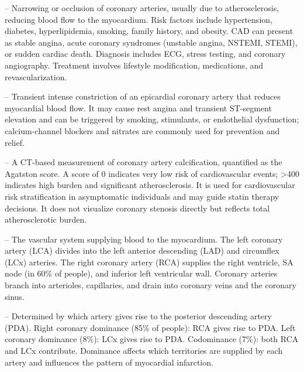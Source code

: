 -- Narrowing or occlusion of coronary arteries, usually due to atherosclerosis, reducing blood flow to the myocardium. Risk factors include hypertension, diabetes, hyperlipidemia, smoking, family history, and obesity. CAD can present as stable angina, acute coronary syndromes (unstable angina, NSTEMI, STEMI), or sudden cardiac death. Diagnosis includes ECG, stress testing, and coronary angiography. Treatment involves lifestyle modification, medications, and revascularization.

-- Transient intense constriction of an epicardial coronary artery that reduces myocardial blood flow. It may cause rest angina and transient ST-segment elevation and can be triggered by smoking, stimulants, or endothelial dysfunction; calcium-channel blockers and nitrates are commonly used for prevention and relief.

-- A CT-based measurement of coronary artery calcification, quantified as the Agatston score. A score of 0 indicates very low risk of cardiovascular events; >400 indicates high burden and significant atherosclerosis. It is used for cardiovascular risk stratification in asymptomatic individuals and may guide statin therapy decisions. It does not visualize coronary stenosis directly but reflects total atherosclerotic burden.

-- The vascular system supplying blood to the myocardium. The left coronary artery (LCA) divides into the left anterior descending (LAD) and circumflex (LCx) arteries. The right coronary artery (RCA) supplies the right ventricle, SA node (in 60\% of people), and inferior left ventricular wall. Coronary arteries branch into arterioles, capillaries, and drain into coronary veins and the coronary sinus.

-- Determined by which artery gives rise to the posterior descending artery (PDA). Right coronary dominance (85\% of people): RCA gives rise to PDA. Left coronary dominance (8\%): LCx gives rise to PDA. Codominance (7\%): both RCA and LCx contribute. Dominance affects which territories are supplied by each artery and influences the pattern of myocardial infarction.

